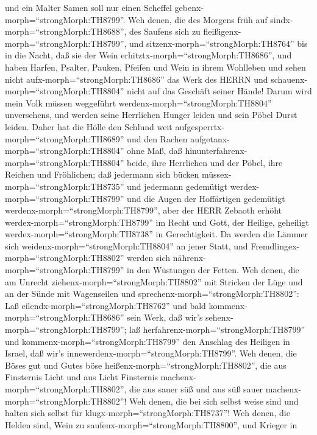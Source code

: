 und ein Malter Samen soll nur einen Scheffel
gebenx-morph=``strongMorph:TH8799''.  Weh denen, die des
Morgens früh auf sindx-morph=``strongMorph:TH8688'', des Saufens sich zu
fleißigenx-morph=``strongMorph:TH8799'', und
sitzenx-morph=``strongMorph:TH8764'' bis in die Nacht, daß sie der Wein
erhitztx-morph=``strongMorph:TH8686'',  und haben Harfen,
Psalter, Pauken, Pfeifen und Wein in ihrem Wohlleben und sehen nicht
aufx-morph=``strongMorph:TH8686'' das Werk des HERRN und
schauenx-morph=``strongMorph:TH8804'' nicht auf das Geschäft seiner
Hände!  Darum wird mein Volk müssen weggeführt
werdenx-morph=``strongMorph:TH8804'' unversehens, und werden seine
Herrlichen Hunger leiden und sein Pöbel Durst leiden. 
Daher hat die Hölle den Schlund weit
aufgesperrtx-morph=``strongMorph:TH8689'' und den Rachen
aufgetanx-morph=``strongMorph:TH8804'' ohne Maß, daß
hinunterfahrenx-morph=``strongMorph:TH8804'' beide, ihre Herrlichen und
der Pöbel, ihre Reichen und Fröhlichen;  daß jedermann sich
bücken müssex-morph=``strongMorph:TH8735'' und jedermann gedemütigt
werdex-morph=``strongMorph:TH8799'' und die Augen der Hoffärtigen
gedemütigt werdenx-morph=``strongMorph:TH8799'',  aber der
HERR Zebaoth erhöht werdex-morph=``strongMorph:TH8799'' im Recht und
Gott, der Heilige, geheiligt werdex-morph=``strongMorph:TH8738'' in
Gerechtigkeit.  Da werden die Lämmer sich
weidenx-morph=``strongMorph:TH8804'' an jener Statt, und
Fremdlingex-morph=``strongMorph:TH8802'' werden sich
nährenx-morph=``strongMorph:TH8799'' in den Wüstungen der Fetten.
 Weh denen, die am Unrecht
ziehenx-morph=``strongMorph:TH8802'' mit Stricken der Lüge und an der
Sünde mit Wagenseilen  und
sprechenx-morph=``strongMorph:TH8802'': Laß
eilendx-morph=``strongMorph:TH8762'' und bald
kommenx-morph=``strongMorph:TH8686'' sein Werk, daß wir's
sehenx-morph=``strongMorph:TH8799''; laß
herfahrenx-morph=``strongMorph:TH8799'' und
kommenx-morph=``strongMorph:TH8799'' den Anschlag des Heiligen in
Israel, daß wir's innewerdenx-morph=``strongMorph:TH8799''.
 Weh denen, die Böses gut und Gutes böse
heißenx-morph=``strongMorph:TH8802'', die aus Finsternis Licht und aus
Licht Finsternis machenx-morph=``strongMorph:TH8802'', die aus sauer süß
und aus süß sauer machenx-morph=``strongMorph:TH8802''! 
Weh denen, die bei sich selbst weise sind und halten sich selbst für
klugx-morph=``strongMorph:TH8737''!  Weh denen, die Helden
sind, Wein zu saufenx-morph=``strongMorph:TH8800'', und Krieger in

